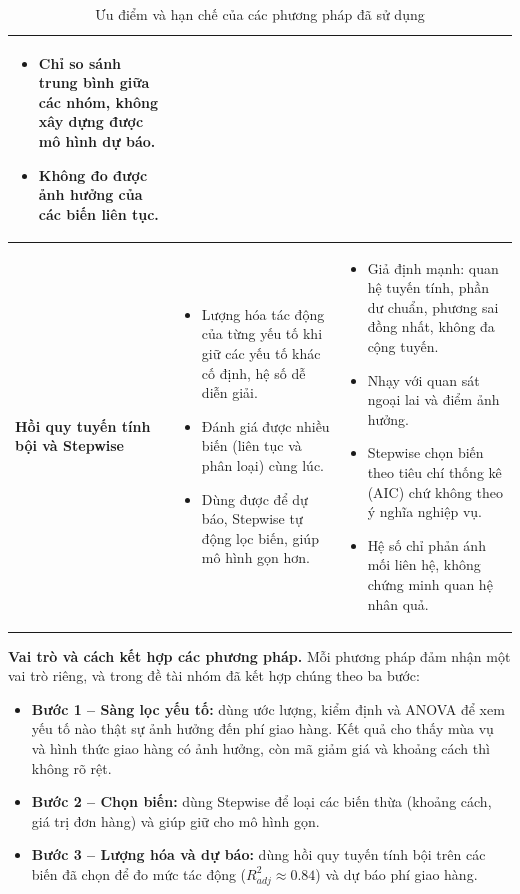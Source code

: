 \begin{table}[H]
\begin{tabular}{|p{2.8cm}|p{6.4cm}|p{6.4cm}|}
\begin{itemize}[nosep,leftmargin=*]
    \item Chỉ so sánh trung bình giữa các nhóm, không xây dựng được mô hình dự báo.
    \item Không đo được ảnh hưởng của các biến liên tục.
\end{itemize} \tabularnewline \hline
\raggedright\textbf{Hồi quy tuyến tính bội và Stepwise} &
\raggedright\begin{itemize}[nosep,leftmargin=*]
    \item Lượng hóa tác động của từng yếu tố khi giữ các yếu tố khác cố định, hệ số dễ diễn giải.
    \item Đánh giá được nhiều biến (liên tục và phân loại) cùng lúc.
    \item Dùng được để dự báo, Stepwise tự động lọc biến, giúp mô hình gọn hơn.
\end{itemize} &
\raggedright\begin{itemize}[nosep,leftmargin=*]
    \item Giả định mạnh: quan hệ tuyến tính, phần dư chuẩn, phương sai đồng nhất, không đa cộng tuyến.
    \item Nhạy với quan sát ngoại lai và điểm ảnh hưởng.
    \item Stepwise chọn biến theo tiêu chí thống kê (AIC) chứ không theo ý nghĩa nghiệp vụ.
    \item Hệ số chỉ phản ánh mối liên hệ, không chứng minh quan hệ nhân quả.
\end{itemize} \tabularnewline \hline
\end{tabular}
\caption{Ưu điểm và hạn chế của các phương pháp đã sử dụng}
\label{tab:uu_nhuoc}
\end{table}

\textbf{Vai trò và cách kết hợp các phương pháp.} Mỗi phương pháp đảm nhận một vai trò riêng, và trong đề tài nhóm đã kết hợp chúng theo ba bước:
\begin{itemize}
    \item \textbf{Bước 1 -- Sàng lọc yếu tố:} dùng ước lượng, kiểm định và ANOVA để xem yếu tố nào thật sự ảnh hưởng đến phí giao hàng. Kết quả cho thấy mùa vụ và hình thức giao hàng có ảnh hưởng, còn mã giảm giá và khoảng cách thì không rõ rệt.
    \item \textbf{Bước 2 -- Chọn biến:} dùng Stepwise để loại các biến thừa (khoảng cách, giá trị đơn hàng) và giúp giữ cho mô hình gọn.
    \item \textbf{Bước 3 -- Lượng hóa và dự báo:} dùng hồi quy tuyến tính bội trên các biến đã chọn để đo mức tác động ($R^2_{adj} \approx 0.84$) và dự báo phí giao hàng.
\end{itemize}

